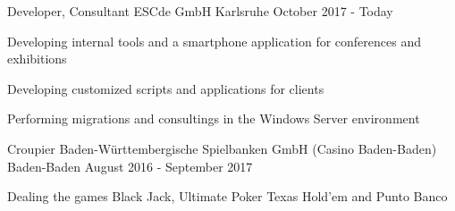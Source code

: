 


\begin{cventries}


\cventry
{Developer, Consultant} %
{ESCde GmbH} %
{Karlsruhe} %
{October 2017 - Today} %
{ %
\begin{cvitems}
\item {Developing internal tools and a smartphone application for conferences and exhibitions}
\item {Developing customized scripts and applications for clients}
\item {Performing migrations and consultings in the Windows Server environment}
\end{cvitems}
}

\cventry
{Croupier} %
{Baden-Württembergische Spielbanken GmbH (Casino Baden-Baden)} %
{Baden-Baden} %
{August 2016 - September 2017} %
{ %
\begin{cvitems}
\item {Dealing the games Black Jack, Ultimate Poker Texas Hold'em and Punto Banco}
\end{cvitems}
}

\end{cventries}